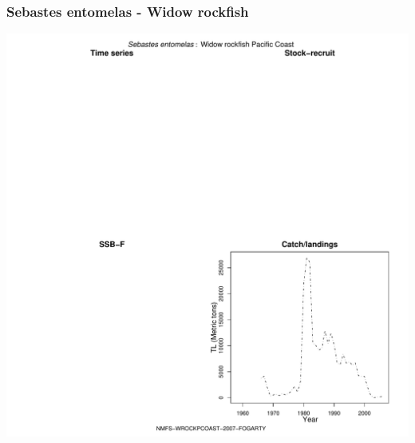 \subsubsection{Sebastes entomelas - Widow rockfish}
\begin{center}
\includegraphics[width=1.2\textwidth]{../R/figures/NMFS-WROCKPCOAST-2007-FOGARTY.pdf}
\end{center}

